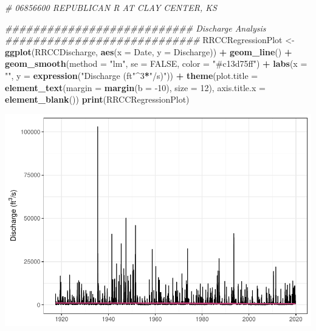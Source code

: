 \documentclass[12pt,]{article}
\newenvironment{Shaded}{\begin{snugshade}}{\end{snugshade}}
\newcommand{\CommentTok}[1]{\textcolor[rgb]{0.56,0.35,0.01}{\textit{#1}}}
\newcommand{\DataTypeTok}[1]{\textcolor[rgb]{0.13,0.29,0.53}{#1}}
\newcommand{\DecValTok}[1]{\textcolor[rgb]{0.00,0.00,0.81}{#1}}
\newcommand{\KeywordTok}[1]{\textcolor[rgb]{0.13,0.29,0.53}{\textbf{#1}}}
\newcommand{\NormalTok}[1]{#1}
\newcommand{\OperatorTok}[1]{\textcolor[rgb]{0.81,0.36,0.00}{\textbf{#1}}}
\newcommand{\OtherTok}[1]{\textcolor[rgb]{0.56,0.35,0.01}{#1}}
\newcommand{\StringTok}[1]{\textcolor[rgb]{0.31,0.60,0.02}{#1}}
\begin{document}
\begin{Shaded}
\begin{Highlighting}[]
\CommentTok{# 06856600 REPUBLICAN R AT CLAY CENTER, KS}

\CommentTok{########################### Discharge Analysis ############################}
\NormalTok{RRCCRegressionPlot <-}\StringTok{ }
\StringTok{  }\KeywordTok{ggplot}\NormalTok{(RRCCDischarge, }\KeywordTok{aes}\NormalTok{(}\DataTypeTok{x =}\NormalTok{ Date, }\DataTypeTok{y =}\NormalTok{ Discharge)) }\OperatorTok{+}
\StringTok{  }\KeywordTok{geom_line}\NormalTok{() }\OperatorTok{+}
\StringTok{  }\KeywordTok{geom_smooth}\NormalTok{(}\DataTypeTok{method =} \StringTok{"lm"}\NormalTok{, }\DataTypeTok{se =} \OtherTok{FALSE}\NormalTok{, }\DataTypeTok{color =} \StringTok{"#c13d75ff"}\NormalTok{) }\OperatorTok{+}
\StringTok{  }\KeywordTok{labs}\NormalTok{(}\DataTypeTok{x =} \StringTok{""}\NormalTok{, }\DataTypeTok{y =} \KeywordTok{expression}\NormalTok{(}\StringTok{"Discharge (ft"}\OperatorTok{^}\DecValTok{3}\OperatorTok{*}\StringTok{"/s)"}\NormalTok{)) }\OperatorTok{+}\StringTok{ }
\StringTok{  }\KeywordTok{theme}\NormalTok{(}\DataTypeTok{plot.title =} \KeywordTok{element_text}\NormalTok{(}\DataTypeTok{margin =} \KeywordTok{margin}\NormalTok{(}\DataTypeTok{b =} \DecValTok{-10}\NormalTok{), }\DataTypeTok{size =} \DecValTok{12}\NormalTok{), }
        \DataTypeTok{axis.title.x =} \KeywordTok{element_blank}\NormalTok{())}
\KeywordTok{print}\NormalTok{(RRCCRegressionPlot)}
\end{Highlighting}
\end{Shaded}

\includegraphics{Project_Template_files/figure-latex/unnamed-chunk-6-19.pdf}
\end{document}
